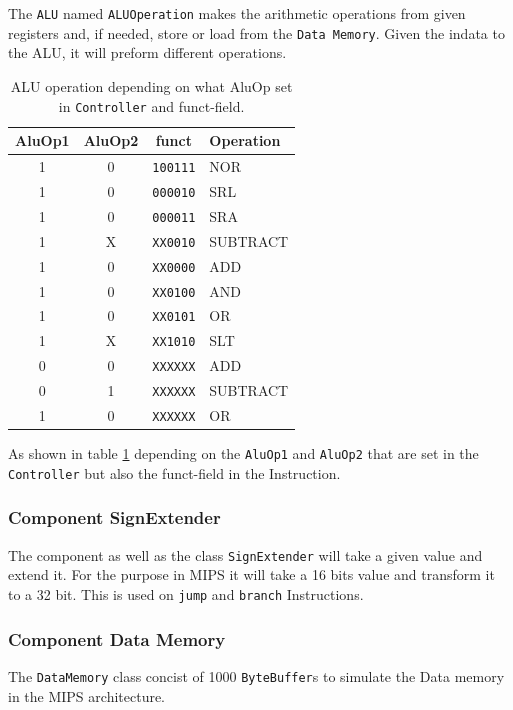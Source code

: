 The \texttt{ALU} named \texttt{ALUOperation} makes the arithmetic
operations from given registers and, if needed, store or load from the
\texttt{Data Memory}. Given the indata to the ALU, it will preform
different operations.

\begin{table}[H]
\centering
\begin{tabular}{ccc|l}
AluOp1&AluOp2   &funct      &Operation  \\\hline
1     & 0     & \texttt{100111}     &NOR         \\\hline
1     & 0     & \texttt{000010}     &SRL         \\\hline
1     & 0     & \texttt{000011}     &SRA         \\\hline
1     & X     & \texttt{XX0010}     &SUBTRACT    \\\hline
1     & 0     & \texttt{XX0000}     &ADD         \\\hline
1     & 0     & \texttt{XX0100}     &AND         \\\hline
1     & 0     & \texttt{XX0101}     &OR          \\\hline
1     & X     & \texttt{XX1010}     &SLT         \\\hline
0     & 0     & \texttt{XXXXXX}     &ADD         \\\hline
0     & 1     & \texttt{XXXXXX}     &SUBTRACT    \\\hline
1     & 0     & \texttt{XXXXXX}     &OR          \\\hline
\end{tabular}
\caption{ALU operation depending on what AluOp set in \texttt{Controller} and funct-field.}
\label{tab:ALUoperation}
\end{table}

As shown in table \ref{tab:ALUoperation} depending on the
\texttt{AluOp1} and \texttt{AluOp2} that are set in the
\texttt{Controller} but also the funct-field in the Instruction.

\subsubsection{Component SignExtender}

The component as well as the class \texttt{SignExtender} will take a
given value and extend it. For the purpose in MIPS it will take a 16
bits value and transform it to a 32 bit. This is used on \texttt{jump}
and \texttt{branch} Instructions.

\subsubsection{Component Data Memory}

The \texttt{DataMemory} class concist of 1000 \texttt{ByteBuffer}s to
simulate the Data memory in the MIPS architecture.

